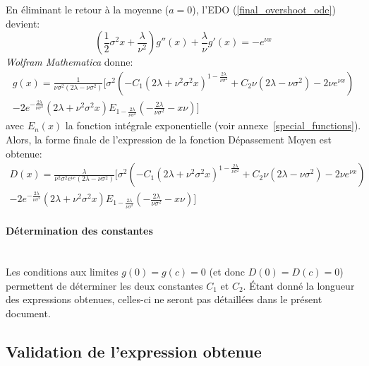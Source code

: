 En éliminant le retour à la moyenne ($a=0$), l'\acs{EDO} (\ref{final_overshoot_ode}) devient:
\begin{equation}\label{particular_overshoot_ode}
    \left(\frac{1}{2}\sigma^2x+\frac{\lambda}{\nu^2}\right)g''(x)+\frac{\lambda}{\nu}g'(x) =-e^{\nu x}
\end{equation}
\textit{Wolfram Mathematica} donne:
\[
\begin{aligned}
    g(x)=\frac{1}{{\nu\sigma^2(2\lambda-\nu\sigma^2)}}\Bigg[\sigma^2\left(-C_1 \left(2 \lambda +\nu ^2 \sigma ^2 x\right)^{1-\frac{2 \lambda }{\nu  \sigma ^2}}+C_2 \nu  \left(2 \lambda -\nu  \sigma ^2\right)-2 \nu  e^{\nu  x}\right) \\-2 e^{-\frac{2 \lambda }{\nu  \sigma ^2}} \left(2 \lambda +\nu ^2 \sigma ^2 x\right) E_{1-\frac{2 \lambda }{\nu  \sigma ^2}}\left(-\frac{2 \lambda }{\nu  \sigma ^2}-x \nu \right)\Bigg]
\end{aligned}
\]
avec $E_n(x)$ la fonction intégrale exponentielle (voir annexe~\ref{special_functions}). \\
Alors, la forme finale de l'expression de la fonction Dépassement Moyen est obtenue:
\begin{equation}\label{sol_overshoot}
    \begin{aligned}
            D(x)=\frac{\lambda}{{\nu^2\sigma^2e^{\nu c}(2\lambda-\nu\sigma^2)}}\Bigg[\sigma^2\left(-C_1 \left(2 \lambda +\nu ^2 \sigma ^2 x\right)^{1-\frac{2 \lambda }{\nu  \sigma ^2}}+C_2 \nu  \left(2 \lambda -\nu  \sigma ^2\right)-2 \nu  e^{\nu  x}\right) \\-2 e^{-\frac{2 \lambda }{\nu  \sigma ^2}} \left(2 \lambda +\nu ^2 \sigma ^2 x\right) E_{1-\frac{2 \lambda }{\nu  \sigma ^2}}\left(-\frac{2 \lambda }{\nu  \sigma ^2}-x \nu \right)\Bigg]
    \end{aligned}
\end{equation}

\paragraph{Détermination des constantes}\phantom{}\\
Les conditions aux limites $g(0)=g(c)=0$ (et donc $D(0)=D(c)=0$) permettent de déterminer les deux constantes $C_1$ et $C_2$. Étant donné la longueur des expressions obtenues, celles-ci ne seront pas détaillées dans le présent document.

\subsection{Validation de l'expression obtenue}
